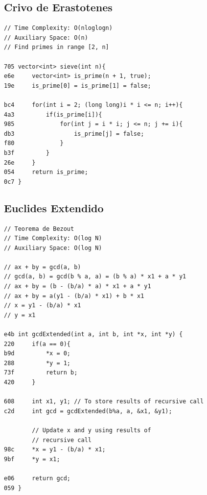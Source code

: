 \documentclass[11pt, a4paper, twoside]{article}
\begin{document}
\subsection{Crivo de Erastotenes}
\begin{lstlisting}
// Time Complexity: O(nloglogn)
// Auxiliary Space: O(n)
// Find primes in range [2, n]

705 vector<int> sieve(int n){
e6e     vector<int> is_prime(n + 1, true);
19e     is_prime[0] = is_prime[1] = false;
    
bc4     for(int i = 2; (long long)i * i <= n; i++){
4a3         if(is_prime[i]){
985             for(int j = i * i; j <= n; j += i){
db3                 is_prime[j] = false;
f80             }
b3f         }
26e     }
054     return is_prime;
0c7 }
\end{lstlisting}

\subsection{Euclides Extendido}
\begin{lstlisting}
// Teorema de Bezout
// Time Complexity: O(log N)
// Auxiliary Space: O(log N)

// ax + by = gcd(a, b)
// gcd(a, b) = gcd(b % a, a) = (b % a) * x1 + a * y1
// ax + by = (b - (b/a) * a) * x1 + a * y1
// ax + by = a(y1 - (b/a) * x1) + b * x1
// x = y1 - (b/a) * x1
// y = x1

e4b int gcdExtended(int a, int b, int *x, int *y) { 
220     if(a == 0){ 
b9d         *x = 0; 
288         *y = 1; 
73f         return b; 
420     } 
     
608     int x1, y1; // To store results of recursive call 
c2d     int gcd = gcdExtended(b%a, a, &x1, &y1); 
     
        // Update x and y using results of 
        // recursive call 
98c     *x = y1 - (b/a) * x1; 
9bf     *y = x1; 
     
e06     return gcd; 
059 } 
 
\end{lstlisting}
\end{document}
